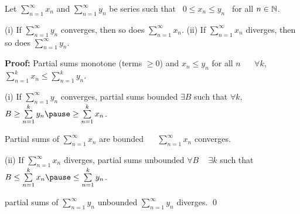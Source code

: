 \documentclass[10pt,aspectratio=169]{beamer}
\begin{document}
\begin{frame}

\begin{proposition}
Let $\displaystyle\sum_{n=1}^\infty x_n$ and $\displaystyle\sum_{n=1}^\infty y_n$ be series such that ~$0 \leq x_n \leq y_n$~
for all $n \in {\mathbb{N}}$.

\pause
(i)
If $\displaystyle\sum_{n=1}^\infty y_n$ converges, then so does
$\displaystyle\sum_{n=1}^\infty x_n$.
\pause
\qquad
(ii)
If $\displaystyle\sum_{n=1}^\infty x_n$ diverges, then so does
$\displaystyle\sum_{n=1}^\infty y_n$.
\end{proposition}

\pause
\textbf{Proof:}
Partial sums monotone (terms $\geq 0$) and
\quad
\pause
$x_n \leq y_n$ for all $n$ ~\thus~
$\forall k$,
~%
$\sum\limits_{n=1}^k x_n \leq \sum\limits_{n=1}^k y_n$.

\pause
(i) If $\sum\limits_{n=1}^\infty y_n$ converges, partial sums bounded
\wthus
$\exists B$ such that
$\forall k$,
\quad
$B \geq \sum\limits_{n=1}^k y_n
\pause
\geq
\sum\limits_{n=1}^k x_n$.

\pause
\medskip

Partial sums of $\sum\limits_{n=1}^\infty x_n$ are bounded ~\thus~
$\sum\limits_{n=1}^\infty x_n$ converges.

\pause
\medskip

(ii)
If $\sum\limits_{n=1}^\infty x_n$ diverges, partial sums unbounded
\pause
\wthus
$\forall B$ ~ $\exists k$ such that
\quad
$B \leq \sum\limits_{n=1}^k x_n
\pause
\leq \sum\limits_{n=1}^k y_n$.


\pause
\thus \quad partial sums of $\sum\limits_{n=1}^\infty y_n$ unbounded
\wthus $\sum\limits_{n=1}^\infty y_n$ diverges.
\qed

\end{frame}
\end{document}
